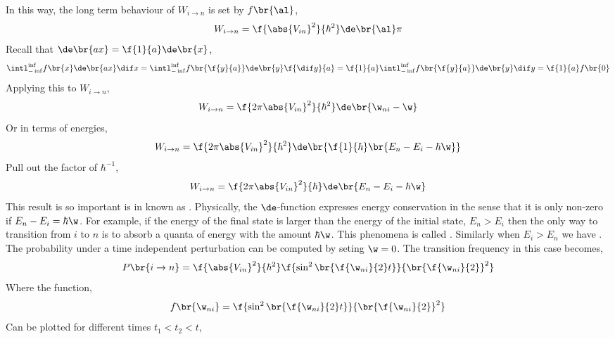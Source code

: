 \documentclass{article}
\begin{document}
In this way, the long term behaviour of $W_{i \to n}$ is set by $f\br{\al}$,
\[ W_{i \to n} = \f {\abs{V_{in}}^2} {\hbar^2} \de\br{\al} \pi \]
Recall that $\de\br{ax} = \f{1}{a} \de\br{x}$,
\[ \intl_{-\inf}^{\inf} f\br{x} \de\br{a x} \dif x = \intl_{-\inf}^{\inf} f\br{\f{y}{a}} \de\br{y} \f{\dif y}{a} = \f{1}{a} \intl_{-\inf}^{\inf} f\br{\f{y}{a}} \de\br{y} \dif y = \f{1}{a}f\br{0} \]
Applying this to $W_{i \to n}$,
\[ W_{i \to n} = \f {2 \pi \abs{V_{in}}^2} {\hbar^2} \de\br{\w_{ni}- \w}\]
Or in terms of energies,
\[ W_{i \to n} = \f {2 \pi \abs{V_{in}}^2} {\hbar^2} \de\br{\f{1}{\hbar}\br{E_{n} - E_{i} - \hbar\w}}\]
Pull out the factor of $\hbar^{-1}$,
\[ W_{i \to n} = \f {2 \pi \abs{V_{in}}^2} {\hbar} \de\br{{E_{n} - E_{i} - \hbar\w}}\]
This result is so important is in known as . Physically, the $\de$-function expresses energy conservation in the sense that it is only non-zero if $E_n - E_i = \hbar \w$. For example, if the energy of the final state is larger than the energy of the initial state, $E_n > E_i$ then the only way to transition from $i$ to $n$ is to absorb a quanta of energy with the amount $\hbar \w$. This phenomena is called . Similarly when $E_i > E_n$ we have . \\

The probability under a time independent perturbation can be computed by seting $\w = 0$. The transition frequency in this case becomes,
\[ P\br{i \to n}= \f{\abs{V_{in}}^2}{\hbar^2} \f{\sin^2\br{\f{\w_{ni}}{2}t}}{\br{\f{\w_{ni}}{2}}^2} \]
Where the function,
\[ f\br{\w_{ni}} = \f{\sin^2\br{\f{\w_{ni}}{2}t}}{\br{\f{\w_{ni}}{2}}^2} \]
Can be plotted for different times $t_1 < t_2 < t$,

\begin{center}
\end{center}
\end{document}
